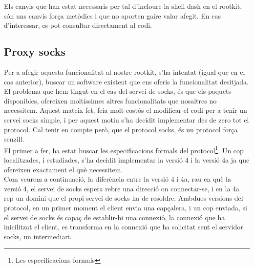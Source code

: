 Els canvis que han estat necessaris per tal d'incloure la shell dash en el rootkit, són uns canvis força
metòdics i que no aporten gaire valor afegit. En cas d'interessar, es pot consultar directament al codi.\\

\subsection{Proxy socks}
Per a afegir aquesta funcionalitat al nostre rootkit, s'ha intentat (igual que en el cas anterior), buscar
un software existent que ens oferis la funcionalitat desitjada. El problema que hem tingut en el cas del servei de
socks, és que els paquets disponibles, ofereixen moltíssimes altres funcionalitats que nosaltres no
necessitem. Aquest mateix fet, feia molt costós el modificar el codi per a tenir un servei socks simple, i 
per aquest motiu s'ha decidit implementar des de zero tot el protocol. Cal tenir en compte però,
que el protocol socks, és un protocol força senzill. \\

El primer a fer, ha estat buscar les especificacions formals del protocol\footnote{Les especificacions 
formals}. Un cop localitzades, i estudiades, s'ha decidit implementar la versió 4 i la versió 4a ja 
que ofereixen exactament el què necessitem. \\

Com veurem a continuació, la diferència entre la versió 4 i 4a, rau en què la versió 4, el servei de socks
espera rebre una direcció on connectar-se, i en la 4a rep un domini que el propi servei de socks ha de
resoldre. Ambdues versions del protocol, en un primer moment el client envia una capçalera, i un cop enviada,
si el servei de socks és capaç de establir-hi una connexió, la connexió que ha inicilitzat el client, es
transforma en la connexió que ha solicitat sent el servidor socks, un intermediari.


